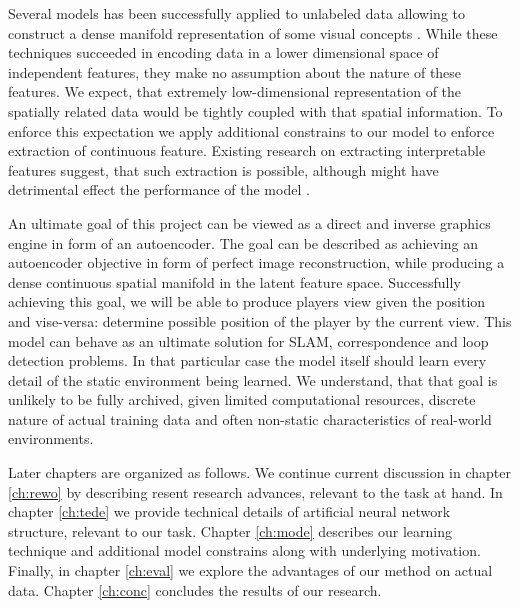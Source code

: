 Several models has been successfully applied to unlabeled data allowing to construct a dense manifold representation of some visual concepts \cite{Li2015, Kingma2013, Goodfellow2014}.
While these techniques succeeded in encoding data in a lower dimensional space of independent features, they make no assumption about the nature of these features.
We expect, that extremely low-dimensional representation of the spatially related data  would be tightly coupled with that spatial information.
To enforce this expectation we apply additional constrains to our model to enforce extraction of continuous feature.
Existing research on extracting interpretable features suggest, that such extraction is possible, although might have detrimental effect the performance of the model \cite{Lei2016, Kulkarni2015}.

An ultimate goal of this project can be viewed as a direct and inverse graphics engine in form of an autoencoder.
The goal can be described as achieving an autoencoder objective in form of perfect image reconstruction, while producing a dense continuous spatial manifold in the latent feature space.
Successfully achieving this goal, we will be able to produce players view given the position and vise-versa: determine possible position of the player by the current view.
This model can behave as an ultimate solution for SLAM, correspondence and loop detection problems.
In that particular case the model itself should learn every detail of the static environment being learned.
We understand, that that goal is unlikely to be fully archived, given limited computational resources, discrete nature of actual training data and often non-static characteristics of real-world environments.

Later chapters are organized as follows.
We continue current discussion in chapter \ref{ch:rewo} by describing resent research advances, relevant to the task at hand.
In chapter \ref{ch:tede} we provide technical details of artificial neural network structure, relevant to our task.
Chapter \ref{ch:mode} describes our learning technique and additional model constrains along with underlying motivation.
Finally, in chapter \ref{ch:eval} we explore the advantages of our method on actual data.
Chapter \ref{ch:conc} concludes the results of our research.
